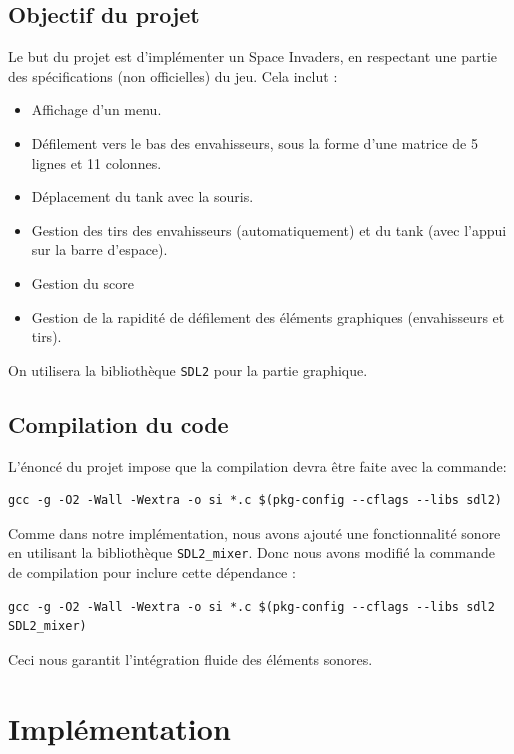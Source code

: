 \documentclass[12pt,a4paper]{report}
\begin{document}
\section{Objectif du projet}
Le but du projet est d’implémenter un Space Invaders, en respectant une partie des spécifications (non officielles) du jeu. Cela inclut :
\begin{itemize}
    \item  Affichage d’un menu.
    \item  Défilement vers le bas des envahisseurs, sous la forme d’une matrice de 5 lignes et 11 colonnes.
    \item  Déplacement du tank avec la souris.
    \item Gestion des tirs des envahisseurs (automatiquement) et du tank (avec l’appui sur la barre
d’espace).
    \item Gestion du score
    \item Gestion de la rapidité de défilement des éléments graphiques (envahisseurs et tirs).
    
    
\end{itemize}
On utilisera la bibliothèque \texttt{SDL2} pour la partie graphique.

\section{Compilation du code}
L’énoncé du projet impose que la compilation devra être faite avec la commande:

\begin{lstlisting}
gcc -g -O2 -Wall -Wextra -o si *.c $(pkg-config --cflags --libs sdl2)

\end{lstlisting}

Comme dans notre implémentation, nous avons ajouté une fonctionnalité sonore en utilisant la bibliothèque \texttt{SDL2\_mixer}. Donc nous avons modifié la commande de compilation  pour inclure cette dépendance :

\begin{lstlisting}
gcc -g -O2 -Wall -Wextra -o si *.c $(pkg-config --cflags --libs sdl2 SDL2_mixer)

\end{lstlisting}

Ceci nous garantit l'intégration fluide des éléments sonores.

\newpage

\chapter{Implémentation}
\end{document}
